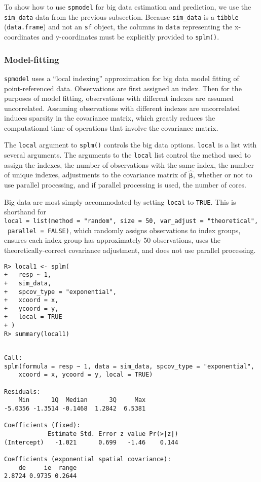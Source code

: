 \documentclass[10pt,letterpaper]{article}
\begin{document}
To show how to use \texttt{spmodel} for big data estimation and
prediction, we use the \texttt{sim\_data} data from the previous
subsection. Because \texttt{sim\_data} is a \texttt{tibble}
(\texttt{data.frame}) and not an \texttt{sf} object, the columns in
\texttt{data} representing the x-coordinates and y-coordinates must be
explicitly provided to \texttt{splm()}.

\hypertarget{model-fitting}{%
\subsubsection{Model-fitting}\label{model-fitting}}

\texttt{spmodel} uses a ``local indexing'' approximation for big data
model fitting of point-referenced data. Observations are first assigned
an index. Then for the purposes of model fitting, observations with
different indexes are assumed uncorrelated. Assuming observations with
different indexes are uncorrelated induces sparsity in the covariance
matrix, which greatly reduces the computational time of operations that
involve the covariance matrix.

The \texttt{local} argument to \texttt{splm()} controls the big data
options. \texttt{local} is a list with several arguments. The arguments
to the \texttt{local} list control the method used to assign the
indexes, the number of observations with the same index, the number of
unique indexes, adjustments to the covariance matrix of
\(\hat{\boldsymbol{\beta}}\), whether or not to use parallel processing,
and if parallel processing is used, the number of cores.

Big data are most simply accommodated by setting \texttt{local} to
\texttt{TRUE}. This is shorthand for
\texttt{local\ =\ list(method\ =\ "random",\ size\ =\ 50,\ var\_adjust\ =\ "theoretical",\ parallel\ =\ FALSE)},
which randomly assigns observations to index groups, ensures each index
group has approximately 50 observations, uses the theoretically-correct
covariance adjustment, and does not use parallel processing.

\begin{verbatim}
R> local1 <- splm(
+   resp ~ 1,
+   sim_data,
+   spcov_type = "exponential",
+   xcoord = x,
+   ycoord = y,
+   local = TRUE
+ )
R> summary(local1)
\end{verbatim}

\begin{verbatim}

Call:
splm(formula = resp ~ 1, data = sim_data, spcov_type = "exponential", 
    xcoord = x, ycoord = y, local = TRUE)

Residuals:
    Min      1Q  Median      3Q     Max 
-5.0356 -1.3514 -0.1468  1.2842  6.5381 

Coefficients (fixed):
            Estimate Std. Error z value Pr(>|z|)
(Intercept)   -1.021      0.699   -1.46    0.144

Coefficients (exponential spatial covariance):
    de     ie  range 
2.8724 0.9735 0.2644 
\end{verbatim}
\end{document}
